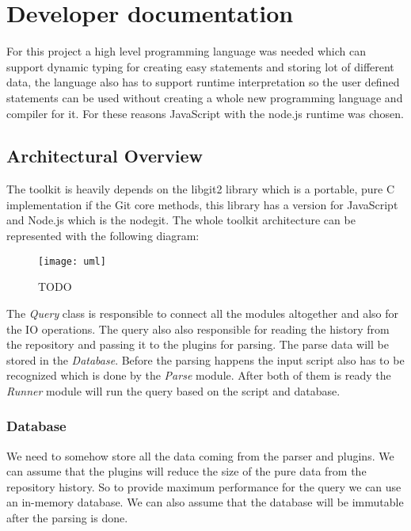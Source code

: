 \chapter{Developer documentation}
\label{ch:impl}

For this project a high level programming language was needed which can support dynamic typing for creating easy statements and storing
lot of different data, the language also has to support runtime interpretation so the user defined statements can be used without
creating a whole new programming language and compiler for it. For these reasons JavaScript with the node.js runtime was chosen. 

\newpage

\section{Architectural Overview}

The toolkit is heavily depends on the libgit2 \cite{libgit2} library which is a portable, pure C implementation  if the Git core methods,
this library has a version for JavaScript and Node.js which is the nodegit\cite{nodegit}.
The whole toolkit architecture can be represented with the following diagram:

\begin{figure}[H]
	\centering
	\texttt{[image: uml]}
	\caption{TODO}
	\label{fig:fig-help}
\end{figure}

The \textit{Query} class is responsible to connect all the modules altogether and also for the IO operations. The query also also
responsible for reading the history from the repository and passing it to the plugins for parsing. The parse data will be stored
in the \textit{Database}. Before the parsing happens the input script also has to be recognized which is done by the \textit{Parse}
module. After both of them is ready the \textit{Runner} module will run the query based on the script and database.
\newpage

\subsection{Database}

We need to somehow store all the data coming from the parser and plugins. We can assume that the plugins will reduce the size of the
pure data from the repository history. So to provide maximum performance for the query we can use an in-memory database. 
We can also assume that the database will be immutable after the parsing is done. 

